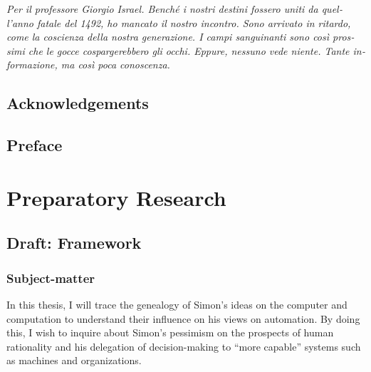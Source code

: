 \documentclass[draft=false, paper=A4,portrait,twoside=true,twocolumn=false,headinclude=false,footinclude=false,fontsize=11,BCOR=15mm,DIV=calc,pagesize=auto,titlepage=firstiscover,mpinclude=true,headings=big,headings=twolinechapter,open=right,chapterprefix=false,headsepline=false,parskip=full]{scrbook}
\begin{document}
\newpage 

\begin{FlushRight}
\begin{italian}
\textit{Per il professore Giorgio Israel. \newline Benché i nostri destini fossero uniti da quell'anno fatale del 1492, \linebreak ho mancato il nostro incontro. \linebreak Sono arrivato in ritardo, come la coscienza della nostra generazione. \linebreak I campi sanguinanti sono così prossimi \linebreak che le gocce cospargerebbero gli occhi. \linebreak Eppure, nessuno vede niente. \linebreak Tante informazione, ma così poca conoscenza.}
\end{italian}
\end{FlushRight}

\newpage
\tableofcontents 

\frontmatter
\pagestyle{plain}
\chapter{Acknowledgements} 

\lipsum

\chapter{Preface} 

\mainmatter
\pagestyle{scrheadings}
\part{Preparatory Research}
\label{sec:orgc31c3c8}
\chapter{Draft: Framework}
\label{sec:org532f47d}
\section{Subject-matter}
\label{sec:orgb6ebfbb}
In this thesis, I will trace the genealogy of Simon's ideas on the computer
and computation to understand their influence on his views on automation.
By doing this, I wish to inquire about Simon's pessimism on the prospects
of human rationality and his delegation of decision-making to
``more capable'' systems such as machines and organizations. 
\end{document}
